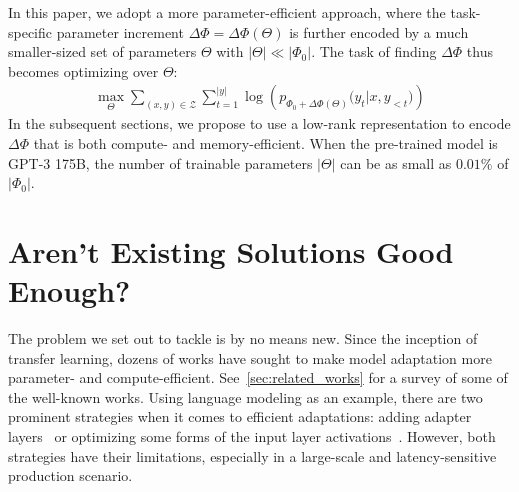 \documentclass{article} %
\begin{document}
In this paper, we adopt a more parameter-efficient approach, where the task-specific parameter increment $\Delta\Phi = \Delta\Phi(\Theta)$ is further encoded by a much smaller-sized set of parameters $\Theta$ with $|\Theta| \ll |\Phi_0|$.
The task of finding $\Delta\Phi$ thus becomes optimizing over $\Theta$:
\begin{align}
    \max_{\Theta} \sum_{(x,y)\in\mathcal{Z}}  \sum_{t=1}^{|y|}  \log\left({p_{\Phi_0+\Delta\Phi(\Theta)}(y_{t} | x, y_{<t}})\right)
\label{eq:ft_add}
\end{align}
In the subsequent sections, we propose to use a low-rank representation to encode $\Delta\Phi$ that is both compute- and memory-efficient.
When the pre-trained model is GPT-3 175B, the number of trainable parameters $|\Theta|$ can be as small as $0.01\%$ of $|\Phi_0|$. %

\section{Aren't Existing Solutions Good Enough?}
\label{sec:existing_solutions_no_good}

The problem we set out to tackle is by no means new.
Since the inception of transfer learning, dozens of works have sought to make model adaptation more parameter- and compute-efficient.
See~\autoref{sec:related_works} for a survey of some of the well-known works.
Using language modeling as an example, there are two prominent strategies when it comes to efficient adaptations: adding adapter layers~\citep{houlsby_parameter-efficient_2019, rebuffi_learning_2017, pfeiffer2021adapterfusion, ruckle2020adapterdrop} or optimizing some forms of the input layer activations~\citep{li_prefix-tuning_2021, lester_power_2021, hambardzumyan_warp_2020, liu_gpt_2021}.
However, both strategies have their limitations, especially in a large-scale and latency-sensitive production scenario.
\end{document}
